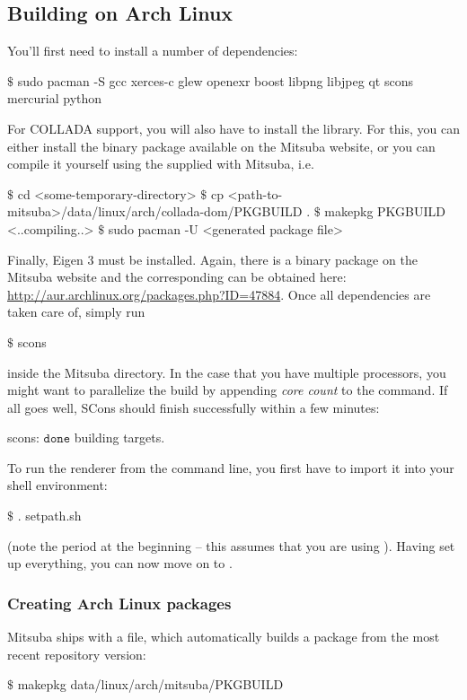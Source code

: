 \subsection{Building on Arch Linux}
You'll first need to install a number of dependencies: 
\begin{shell}
$\text{\$}$ sudo pacman -S gcc xerces-c glew openexr boost libpng libjpeg qt scons mercurial python
\end{shell}
For COLLADA support, you will also have to install the 
library. For this, you can either install the binary package available on
the Mitsuba website, or you can compile it yourself using the 
supplied with Mitsuba, i.e.
\begin{shell}
$\text{\$}$ cd <some-temporary-directory>
$\text{\$}$ cp <path-to-mitsuba>/data/linux/arch/collada-dom/PKGBUILD .
$\text{\$}$ makepkg PKGBUILD
<..compiling..>
$\text{\$}$ sudo pacman -U <generated package file>
\end{shell}
Finally, Eigen 3 must be installed. Again, there is a binary package on the
Mitsuba website and the corresponding  can be obtained here:
\url{http://aur.archlinux.org/packages.php?ID=47884}.
Once all dependencies are taken care of, simply run
\begin{shell}
$\text{\$}$ scons
\end{shell}
inside the Mitsuba directory. In the case that you have multiple processors, you might want to parallelize the build by appending \emph{core count} to the command.
If all goes well, SCons should finish successfully within a few minutes:
\begin{shell}
scons: $\texttt{done}$ building targets.
\end{shell}
To run the renderer from the command line, you first have to import it into your shell environment:
\begin{shell}
$\text{\$}$ . setpath.sh
\end{shell}
(note the period at the beginning -- this assumes that you are using ).
Having set up everything, you can now move on to .
\subsubsection{Creating Arch Linux packages}
Mitsuba ships with a  file, which automatically builds
a package from the most recent repository version:
\begin{shell}
$\text{\$}$ makepkg data/linux/arch/mitsuba/PKGBUILD
\end{shell}

